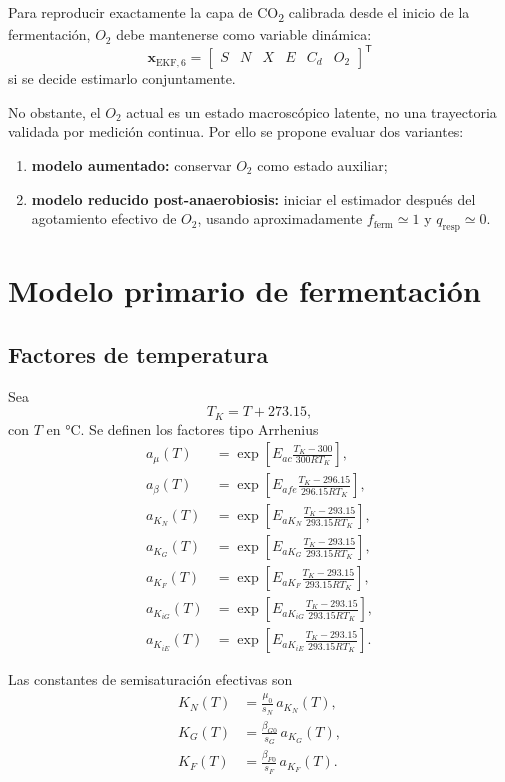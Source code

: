 \documentclass[11pt,a4paper]{article}
\begin{document}
Para reproducir exactamente la capa de CO\textsubscript{2} calibrada desde el inicio de la fermentación,
$O_2$ debe mantenerse como variable dinámica:
\[
\boxed{
\mathbf{x}_{\mathrm{EKF},6}=
\begin{bmatrix}
S & N & X & E & C_d & O_2
\end{bmatrix}^{\mathsf T}}
\]
si se decide estimarlo conjuntamente.

No obstante, el $O_2$ actual es un estado macroscópico latente, no una trayectoria validada por
medición continua. Por ello se propone evaluar dos variantes:
\begin{enumerate}
    \item \textbf{modelo aumentado:} conservar $O_2$ como estado auxiliar;
    \item \textbf{modelo reducido post-anaerobiosis:} iniciar el estimador después del agotamiento
    efectivo de $O_2$, usando aproximadamente $f_{\mathrm{ferm}}\simeq 1$ y
    $q_{\mathrm{resp}}\simeq 0$.
\end{enumerate}

\section{Modelo primario de fermentación}

\subsection{Factores de temperatura}

Sea
\[
T_K=T+273.15,
\]
con $T$ en \si{\degreeCelsius}. Se definen los factores tipo Arrhenius
\begin{align}
a_\mu(T) &=
\exp\left[
E_{ac}\frac{T_K-300}{300RT_K}
\right],\\
a_\beta(T) &=
\exp\left[
E_{afe}\frac{T_K-296.15}{296.15RT_K}
\right],\\
a_{K_N}(T) &=
\exp\left[
E_{aK_N}\frac{T_K-293.15}{293.15RT_K}
\right],\\
a_{K_G}(T) &=
\exp\left[
E_{aK_G}\frac{T_K-293.15}{293.15RT_K}
\right],\\
a_{K_F}(T) &=
\exp\left[
E_{aK_F}\frac{T_K-293.15}{293.15RT_K}
\right],\\
a_{K_{iG}}(T) &=
\exp\left[
E_{aK_{iG}}\frac{T_K-293.15}{293.15RT_K}
\right],\\
a_{K_{iE}}(T) &=
\exp\left[
E_{aK_{iE}}\frac{T_K-293.15}{293.15RT_K}
\right].
\end{align}

Las constantes de semisaturación efectivas son
\begin{align}
K_N(T) &= \frac{\mu_0}{s_N}\,a_{K_N}(T),\\
K_G(T) &= \frac{\beta_{G0}}{s_G}\,a_{K_G}(T),\\
K_F(T) &= \frac{\beta_{F0}}{s_F}\,a_{K_F}(T).
\end{align}
\end{document}
